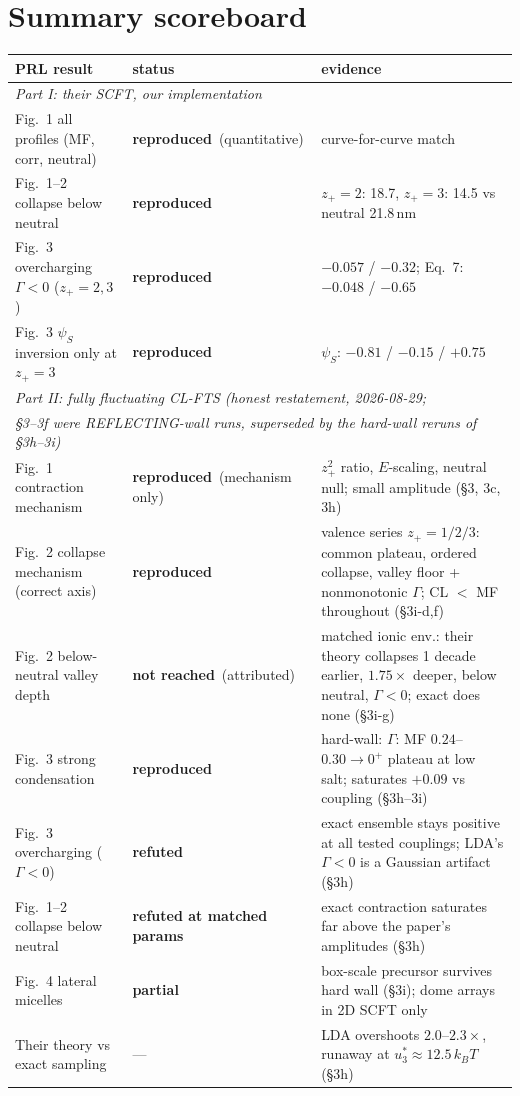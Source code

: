 \documentclass[10pt]{article}
\newcommand{\ok}{\textcolor{green!55!black}{\textbf{reproduced}}}
\newcommand{\partialok}{\textcolor{orange!85!black}{\textbf{partial}}}
\newcommand{\notok}{\textcolor{red!75!black}{\textbf{not reached}}}
\begin{document}
\section*{Summary scoreboard}

\begin{table}[h!]
\centering\small
\begin{tabular}{lll}
\toprule
PRL result & status & evidence \\
\midrule
\multicolumn{3}{l}{\emph{Part I: their SCFT, our implementation}} \\
Fig.~1 all profiles (MF, corr, neutral) & \ok\ (quantitative) & curve-for-curve match \\
Fig.~1--2 collapse below neutral & \ok & $z_+{=}2$: 18.7, $z_+{=}3$: 14.5 vs neutral 21.8\,nm \\
Fig.~3 overcharging $\Gamma<0$ ($z_+{=}2,3$) & \ok & $-0.057$ / $-0.32$; Eq.~7: $-0.048$ / $-0.65$ \\
Fig.~3 $\psi_S$ inversion only at $z_+{=}3$ & \ok & $\psi_S$: $-0.81$ / $-0.15$ / $+0.75$ \\
\midrule
\multicolumn{3}{l}{\emph{Part II: fully fluctuating CL-FTS (honest restatement, 2026-08-29;}} \\
\multicolumn{3}{l}{\emph{\S3--3f were REFLECTING-wall runs, superseded by the hard-wall reruns of \S3h--3i)}} \\
Fig.~1 contraction mechanism & \ok\ (mechanism only) & $z_+^2$ ratio, $E$-scaling, neutral null; small amplitude (\S3, 3c, 3h) \\
Fig.~2 collapse mechanism (correct axis) & \ok & valence series $z_+{=}1/2/3$: common plateau, ordered collapse, valley floor + nonmonotonic $\Gamma$; CL $<$ MF throughout (\S3i-d,f) \\
Fig.~2 below-neutral valley depth & \notok\ (attributed) & matched ionic env.: their theory collapses 1 decade earlier, $1.75\times$ deeper, below neutral, $\Gamma<0$; exact does none (\S3i-g) \\
Fig.~3 strong condensation & \ok & hard-wall: $\Gamma$: MF $0.24$--$0.30 \to 0^+$ plateau at low salt; saturates $+0.09$ vs coupling (\S3h--3i) \\
Fig.~3 overcharging ($\Gamma<0$) & \textcolor{red!75!black}{\textbf{refuted}} & exact ensemble stays positive at all tested couplings; LDA's $\Gamma<0$ is a Gaussian artifact (\S3h) \\
Fig.~1--2 collapse below neutral & \textcolor{red!75!black}{\textbf{refuted at matched params}} & exact contraction saturates far above the paper's amplitudes (\S3h) \\
Fig.~4 lateral micelles & \partialok & box-scale precursor survives hard wall (\S3i); dome arrays in 2D SCFT only \\
Their theory vs exact sampling & --- & LDA overshoots $2.0$--$2.3\times$, runaway at $u_3^* \approx 12.5\,k_BT$ (\S3h) \\
\bottomrule
\end{tabular}
\end{table}
\end{document}
